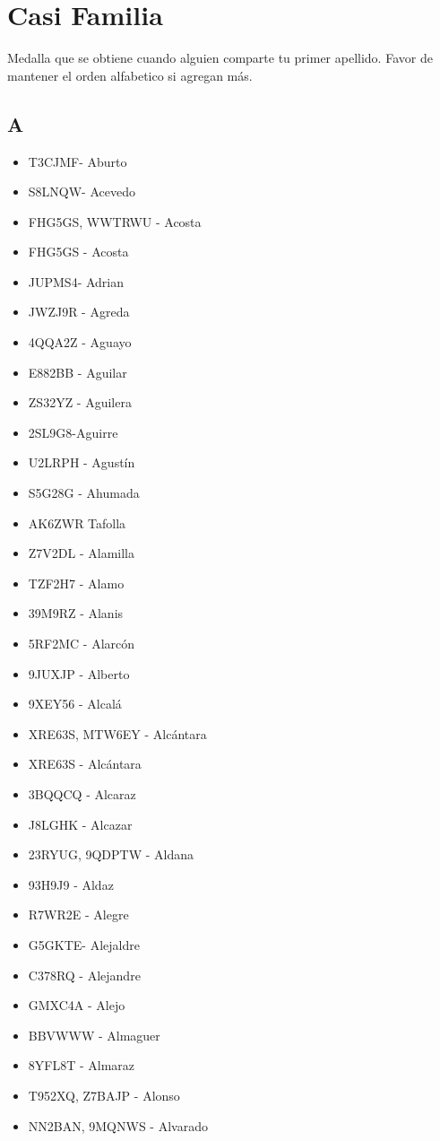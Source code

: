 \section{Casi Familia}
Medalla que se obtiene cuando alguien comparte tu primer apellido. Favor de mantener el orden alfabetico si agregan más.
\subsection*{A}
\begin{itemize}[leftmargin=*,nosep]
\item T3CJMF- Aburto
\item S8LNQW- Acevedo
\item FHG5GS, WWTRWU - Acosta
\item FHG5GS - Acosta
\item JUPMS4- Adrian
\item JWZJ9R - Agreda
\item 4QQA2Z - Aguayo
\item E882BB - Aguilar
\item ZS32YZ - Aguilera
\item 2SL9G8-Aguirre
\item U2LRPH - Agustín
\item S5G28G  -  Ahumada
\item AK6ZWR Tafolla
\item Z7V2DL - Alamilla
\item TZF2H7 - Alamo
\item 39M9RZ - Alanis
\item 5RF2MC  -  Alarcón
\item 9JUXJP - Alberto
\item 9XEY56 - Alcalá
\item XRE63S, MTW6EY - Alcántara
\item XRE63S - Alcántara
\item 3BQQCQ - Alcaraz
\item J8LGHK - Alcazar
\item 23RYUG, 9QDPTW - Aldana
\item 93H9J9 -  Aldaz
\item R7WR2E - Alegre
\item G5GKTE- Alejaldre
\item C378RQ - Alejandre
\item GMXC4A - Alejo
\item BBVWWW  -  Almaguer
\item 8YFL8T - Almaraz
\item T952XQ, Z7BAJP -  Alonso
\item NN2BAN, 9MQNWS - Alvarado

\end{itemize}
